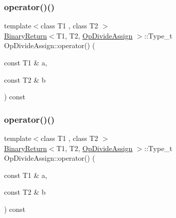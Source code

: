\subsubsection{\texorpdfstring{operator()()}{operator()()}\hspace{0.1cm}{\footnotesize\ttfamily [1/3]}}
{\footnotesize\ttfamily template$<$class T1 , class T2 $>$ \\
\mbox{\hyperlink{structBinaryReturn}{Binary\+Return}}$<$T1, T2, \mbox{\hyperlink{structOpDivideAssign}{Op\+Divide\+Assign}} $>$\+::Type\+\_\+t Op\+Divide\+Assign\+::operator() (\begin{DoxyParamCaption}\item[{const T1 \&}]{a,  }\item[{const T2 \&}]{b }\end{DoxyParamCaption}) const\hspace{0.3cm}{\ttfamily [inline]}}

\mbox{\label{structOpDivideAssign_a805531d103a9b37b9eb9ff4debaf5e41}} 
\subsubsection{\texorpdfstring{operator()()}{operator()()}\hspace{0.1cm}{\footnotesize\ttfamily [2/3]}}
{\footnotesize\ttfamily template$<$class T1 , class T2 $>$ \\
\mbox{\hyperlink{structBinaryReturn}{Binary\+Return}}$<$T1, T2, \mbox{\hyperlink{structOpDivideAssign}{Op\+Divide\+Assign}} $>$\+::Type\+\_\+t Op\+Divide\+Assign\+::operator() (\begin{DoxyParamCaption}\item[{const T1 \&}]{a,  }\item[{const T2 \&}]{b }\end{DoxyParamCaption}) const\hspace{0.3cm}{\ttfamily [inline]}}

\mbox{\label{structOpDivideAssign_a805531d103a9b37b9eb9ff4debaf5e41}} 

